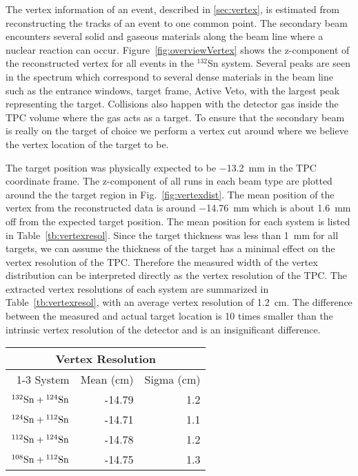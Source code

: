 The vertex information of an event, described in \ref{sec:vertex}, is estimated from reconstructing the tracks of an event to one common point. The secondary beam encounters several solid and gaseous materials along the beam line where a nuclear reaction can occur. Figure~\ref{fig:overviewVertex} shows the z-component of the reconstructed vertex for all events in the ${}^{132}$Sn system. Several peaks are seen in the spectrum which correspond to several dense materials in the beam line such as the entrance windows, target frame, Active Veto, with the largest peak representing the target. Collisions also happen with the detector gas inside the TPC volume where the gas acts as a target. To ensure that the secondary beam is really on the target of choice we perform a vertex cut around where we believe the vertex location of the target to be.
 
 The target position was physically expected to be \SI{-13.2}{\milli\metre} in the TPC coordinate frame. The z-component of all runs in each beam type are plotted around the the target region in Fig.~\ref{fig:vertexdist}. The mean position of the vertex from the reconstructed data is around \SI{-14.76}{\milli\metre} which is about \SI{1.6}{\milli\metre} off from the expected target position. The mean position for each system is listed in Table~\ref{tb:vertexresol}. Since the target thickness was less than \SI{1}{\milli\metre} for all targets, we can assume the thickness of the target has a minimal effect on the vertex resolution of the TPC. Therefore the measured width of the vertex distribution can be interpreted directly as the vertex resolution of the TPC. The extracted vertex resolutions of each system are summarized in Table~\ref{tb:vertexresol}, with an average vertex resolution of \SI{1.2}{\centi\metre}. The difference between the measured and actual target location is 10 times smaller than the intrinsic vertex resolution of the detector and is an insignificant difference.  



\begin{table*}\centering
{}
\begin{tabular}{@{}rrr@{}}\toprule
\multicolumn{3}{c}{Vertex Resolution}\\
\cmidrule{1-3}
System & Mean (cm) & Sigma (cm) \\
\midrule
${}^{132}\mathrm{Sn} + {}^{124}\mathrm{Sn}$ & -14.79  & 1.2 \\
${}^{124}\mathrm{Sn} + {}^{112}\mathrm{Sn}$ & -14.71  & 1.1 \\
${}^{112}\mathrm{Sn} + {}^{124}\mathrm{Sn}$ & -14.78  & 1.2 \\
${}^{108}\mathrm{Sn} + {}^{112}\mathrm{Sn}$ & -14.75  & 1.3 \\ 
\bottomrule
\end{tabular}
\caption{Summary of measured verticies and their resolution.}
\label{tb:vertexresol}
\end{table*}


